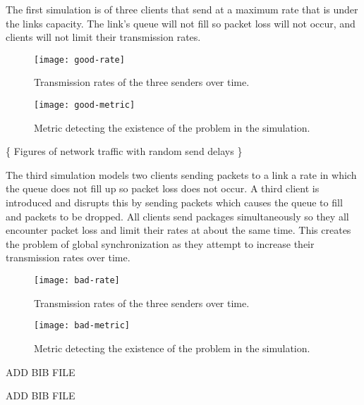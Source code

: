 \documentclass{article}
\begin{document}
	The first simulation is of three clients that send at a maximum rate that is under the links capacity. The link's queue will not fill so packet loss will not occur, and clients will not limit their transmission rates.\newline
	\begin{figure}[H]
		\centering
		\texttt{[image: good-rate]}
		\caption{Transmission rates of the three senders over time.}
	\end{figure}

	\begin{figure}[H]
		\centering
		\texttt{[image: good-metric]}
		\caption{Metric detecting the existence of the problem in the simulation.}
	\end{figure}
	
																			\{ Figures of network traffic with random send delays \}\newline
																			
	The third simulation models two clients sending packets to a link a rate in which the queue does not fill up so packet loss does not occur. A third client is introduced and disrupts this by sending packets which causes the queue to fill and packets to be dropped. All clients send packages simultaneously so they all encounter packet loss and limit their rates at about the same time. This creates the problem of global synchronization as they attempt to increase their transmission rates over time.\newline
	\begin{figure}[H]
		\centering
		\texttt{[image: bad-rate]}
		\caption{Transmission rates of the three senders over time.}
	\end{figure}

	\begin{figure}[H]
		\centering
		\texttt{[image: bad-metric]}
		\caption{Metric detecting the existence of the problem in the simulation.}
	\end{figure}

\begin{thebibliography}{9}
ADD BIB FILE

ADD BIB FILE
\end{thebibliography}
\end{document}
